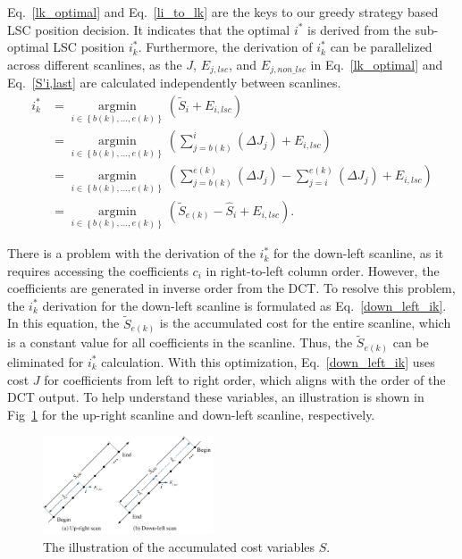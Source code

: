 \documentclass[lettersize,journal]{IEEEtran}
\begin{document}
Eq.~\eqref{lk_optimal} and Eq.~\eqref{li_to_lk} are the keys to our greedy strategy based LSC position decision. It indicates that the optimal $i^{*}$ is derived from the sub-optimal LSC position $i_{k}^{*}$. Furthermore, the derivation of $i_{k}^{*}$ can be parallelized across different scanlines, as the $J$, $E_{j,lsc}$, and $E_{j,non\_lsc}$ in Eq.~\eqref{lk_optimal} and Eq.~\eqref{S'i,last} are calculated independently between scanlines. 
  \begin{equation}
      \begin{aligned}
      \label{down_left_ik}
    i_{k}^{*} 
    &=\mathop{\arg\min}\limits_{i \in \left \{ b(k),...,e(k)\right \} } \left ( \widetilde{S}_{i}+ E_{i,lsc} \right ) \\
    &=\mathop{\arg\min}\limits_{i \in \left \{ b(k),...,e(k)\right \} } \left ( \sum_{j=b(k)}^{i} \left ( \Delta J_{j} \right) + E_{i,lsc} \right ) \\
    &=\mathop{\arg\min}\limits_{i \in \left \{ b(k),...,e(k)\right \} } \left ( \sum_{j=b(k)}^{e(k)} \left ( \Delta J_{j} \right )  - \sum_{j=i}^{e(k)} \left ( \Delta J_{j} \right ) + E_{i,lsc} \right ) \\
    &=\mathop{\arg\min}\limits_{i \in \left \{ b(k),...,e(k)\right \} } \left ( \widetilde{S}_{e(k)} - \hat{S}_{i}  + E_{i,lsc} \right ) .
      \end{aligned}
  \end{equation}
\par
There is a problem with the derivation of the $i_{k}^{*}$ for the down-left scanline, as it requires accessing the coefficients $c_{i}$ in right-to-left column order. However, the coefficients are generated in inverse order from the DCT. To resolve this problem, the $i_{k}^{*}$ derivation for the down-left scanline is formulated as Eq.~\eqref{down_left_ik}. In this equation, the $\widetilde{S}_{e(k)}$ is the accumulated cost for the entire scanline, which is a constant value for all coefficients in the scanline. Thus, the $\widetilde{S}_{e(k)}$ can be eliminated for $i_{k}^{*}$ calculation. With this optimization, Eq.~\eqref{down_left_ik} uses cost $J$ for coefficients from left to right order, which aligns with the order of the DCT output. To help understand these variables, an illustration is shown in Fig~\ref{abcompare} for the up-right scanline and down-left scanline, respectively. 
\begin{figure}[!t]
	\centering
	\centerline{\includegraphics[width=0.45\textwidth]{figure/abcompare.png}} 
    \vspace{-8pt}
	\caption{The illustration of the accumulated cost variables $S$.}
	\label{abcompare} %
\end{figure}
\end{document}
